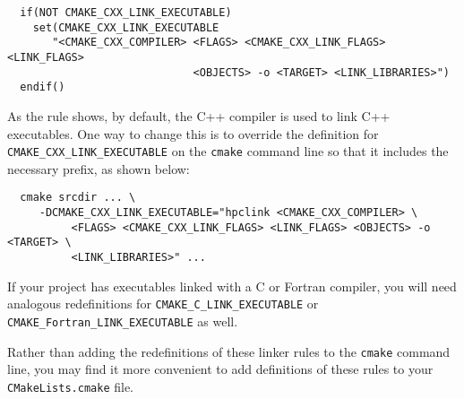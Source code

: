 \documentclass[11pt,letterpaper]{report}
\begin{document}
\begin{verbatim}
  if(NOT CMAKE_CXX_LINK_EXECUTABLE)
    set(CMAKE_CXX_LINK_EXECUTABLE
       "<CMAKE_CXX_COMPILER> <FLAGS> <CMAKE_CXX_LINK_FLAGS> <LINK_FLAGS> 
                             <OBJECTS> -o <TARGET> <LINK_LIBRARIES>")
  endif()
\end{verbatim}

\noindent 
As the rule shows, by default, the C++ compiler is used to link C++ executables. One way to change this is to override the definition for \verb|CMAKE_CXX_LINK_EXECUTABLE|  on the {\tt cmake} command line so that it includes the  necessary \hpclink{} prefix, as shown below:

\begin{verbatim}
  cmake srcdir ... \
     -DCMAKE_CXX_LINK_EXECUTABLE="hpclink <CMAKE_CXX_COMPILER> \
          <FLAGS> <CMAKE_CXX_LINK_FLAGS> <LINK_FLAGS> <OBJECTS> -o <TARGET> \
          <LINK_LIBRARIES>" ...
\end{verbatim}

\noindent
If your project has executables linked with a C or Fortran compiler, you will need analogous redefinitions for \verb|CMAKE_C_LINK_EXECUTABLE| or  \verb|CMAKE_Fortran_LINK_EXECUTABLE| as well.

Rather than adding the redefinitions of these linker rules to the {\tt cmake} command line, 
you may find it more convenient to add definitions of these rules to your {\tt CMakeLists.cmake} file.





\begin{comment}
  hpcviewer shows a loop where there is none: bad line information or compiler-generated (scalarization, copy loop)
  
  hpcviewer shows a call site where there is none: compiler-inserted call

  possible question: What happens if I forget to run hpcstruct?  
No hpcstruct = 
  really crazy procedure & loop bounds
  no inlining detection!


  Note: Beware of kernels 2.6.28 through 2.6.29.2.  These kernels have a rare asynchronous signal race condition where floating point registers are not restored correctly.

  Perf-events kernels 2.6.32-2.6.?? + PAPI = bug where you get a SIGIO in the
  middle of a signal handler.

\end{comment}
\end{document}
